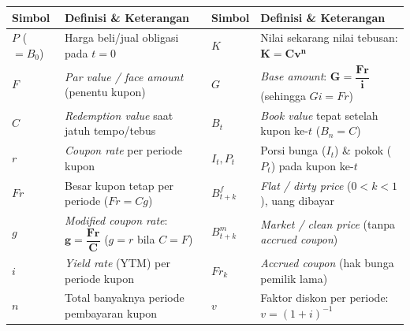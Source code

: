 \documentclass[10pt,a4paper]{article}
\begin{document}
\begin{rumusbox}
\begin{center}
\small
\renewcommand{\arraystretch}{1.18}
\begin{tabular}{@{}p{2.0cm}p{5.4cm}p{2.2cm}p{6.2cm}@{}}
\toprule
\textbf{Simbol} & \textbf{Definisi \& Keterangan} & \textbf{Simbol} & \textbf{Definisi \& Keterangan} \\
\midrule
$P$ ($= B_0$) & Harga beli/jual obligasi pada $t = 0$ & $K$ & Nilai sekarang nilai tebusan: $\mathbf{K = C v^n}$ \\
$F$ & \textit{Par value / face amount} (penentu kupon) & $G$ & \textit{Base amount}: $\mathbf{G = \dfrac{Fr}{i}}$ (sehingga $Gi = Fr$) \\
$C$ & \textit{Redemption value} saat jatuh tempo/tebus & $B_t$ & \textit{Book value} tepat setelah kupon ke-$t$ ($B_n = C$) \\
$r$ & \textit{Coupon rate} per periode kupon & $I_t, P_t$ & Porsi bunga ($I_t$) \& pokok ($P_t$) pada kupon ke-$t$ \\
$Fr$ & Besar kupon tetap per periode ($Fr = Cg$) & $B_{t+k}^f$ & \textit{Flat / dirty price} ($0 < k < 1$), uang dibayar \\
$g$ & \textit{Modified coupon rate}: $\mathbf{g = \dfrac{Fr}{C}}$ ($g=r$ bila $C=F$) & $B_{t+k}^m$ & \textit{Market / clean price} (tanpa \textit{accrued coupon}) \\
$i$ & \textit{Yield rate} (YTM) per periode kupon & $Fr_k$ & \textit{Accrued coupon} (hak bunga pemilik lama) \\
$n$ & Total banyaknya periode pembayaran kupon & $v$ & Faktor diskon per periode: $v = (1+i)^{-1}$ \\
\bottomrule
\end{tabular}
\end{center}
\end{rumusbox}
\end{document}
